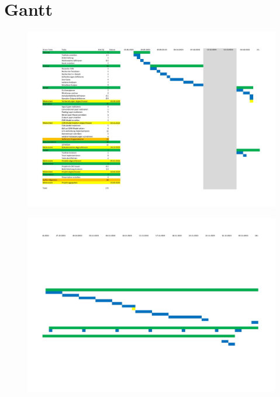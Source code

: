 \section{Gantt}
\label{sec:PlanungGantt}
\begin{landscape}

\begin{figure}[tb]
	\centering
		\includegraphics[width=\pdfpagewidth]{images/gantt1.jpg}
	\label{fig:planunggantt1}
\end{figure}

\begin{figure}[tb]
	\centering
		\includegraphics[width=\pdfpagewidth]{images/gantt2.jpg}
	\label{fig:planunggantt2}
\end{figure}


\end{landscape}

